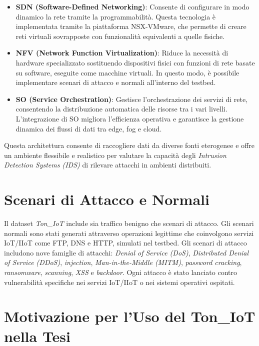 \begin{itemize}
    \item \textbf{SDN (Software-Defined Networking)}: Consente di configurare in modo dinamico la rete tramite la programmabilità. Questa tecnologia è implementata tramite la piattaforma NSX-VMware, che permette di creare reti virtuali sovrapposte con funzionalità equivalenti a quelle fisiche.
    
    \item \textbf{NFV (Network Function Virtualization)}: Riduce la necessità di hardware specializzato sostituendo dispositivi fisici con funzioni di rete basate su software, eseguite come macchine virtuali. In questo modo, è possibile implementare scenari di attacco e normali all'interno del testbed.
    
    \item \textbf{SO (Service Orchestration)}: Gestisce l'orchestrazione dei servizi di rete, consentendo la distribuzione automatica delle risorse tra i vari livelli. L'integrazione di SO migliora l'efficienza operativa e garantisce la gestione dinamica dei flussi di dati tra edge, fog e cloud.
\end{itemize}

Questa architettura consente di raccogliere dati da diverse fonti eterogenee e offre un ambiente flessibile e realistico per valutare la capacità degli \textit{Intrusion Detection Systems (IDS)} di rilevare attacchi in ambienti distribuiti.

\section{Scenari di Attacco e Normali}

Il dataset \textit{Ton\_IoT} include sia traffico benigno che scenari di attacco. Gli scenari normali sono stati generati attraverso operazioni legittime che coinvolgono servizi IoT/IIoT come FTP, DNS e HTTP, simulati nel testbed. Gli scenari di attacco includono nove famiglie di attacchi: \textit{Denial of Service (DoS)}, \textit{Distributed Denial of Service (DDoS)}, \textit{injection}, \textit{Man-in-the-Middle (MITM)}, \textit{password cracking}, \textit{ransomware}, \textit{scanning}, \textit{XSS} e \textit{backdoor}. Ogni attacco è stato lanciato contro vulnerabilità specifiche nei servizi IoT/IIoT o nei sistemi operativi ospitati.

\section{Motivazione per l'Uso del Ton\_IoT nella Tesi}

